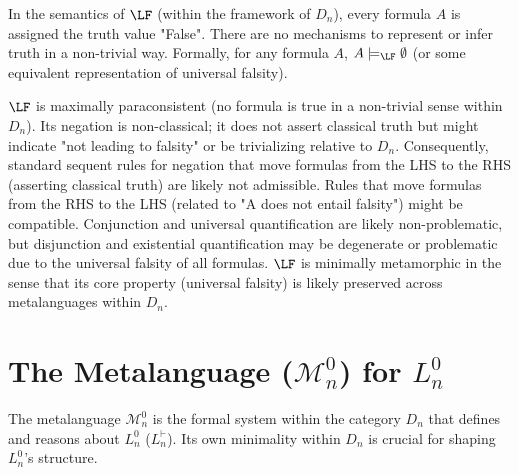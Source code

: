 																																															\begin{definition}[Semantics of $\LF$]
																																																In the semantics of $\LF$ (within the framework of $D_n$), every formula $A$ is assigned the truth value "False". There are no mechanisms to represent or infer truth in a non-trivial way. Formally, for any formula $A$, $A \models_{\LF} \emptyset$ (or some equivalent representation of universal falsity).
																																																\end{definition}
																																																	
																																																	\begin{remark}[Properties of $\LF$]
																																																		$\LF$ is maximally paraconsistent (no formula is true in a non-trivial sense within $D_n$). Its negation is non-classical; it does not assert classical truth but might indicate "not leading to falsity" or be trivializing relative to $D_n$. Consequently, standard sequent rules for negation that move formulas from the LHS to the RHS (asserting classical truth) are likely not admissible. Rules that move formulas from the RHS to the LHS (related to "A does not entail falsity") might be compatible. Conjunction and universal quantification are likely non-problematic, but disjunction and existential quantification may be degenerate or problematic due to the universal falsity of all formulas. $\LF$ is minimally metamorphic in the sense that its core property (universal falsity) is likely preserved across metalanguages within $D_n$.
																																																		\end{remark}
																																																			
																																																			
																																																			\section{The Metalanguage ($\mathcal{M}^0_n$) for $L^0_n$}
																																																			
																																																			The metalanguage $\mathcal{M}^0_n$ is the formal system within the category $D_n$ that defines and reasons about $L^0_n$ ($L^{\vdash}_n$). Its own minimality within $D_n$ is crucial for shaping $L^0_n$'s structure.
																																																			
